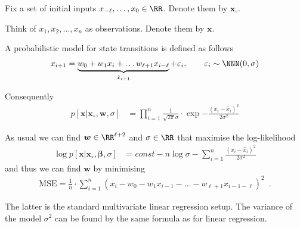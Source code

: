 \documentclass[landscape,footrule]{foils}
\renewcommand{\vec}[1]{\boldsymbol{#1}}
\begin{document}

\begin{triangles}
\item Fix a set of initial inputs $x_{-\ell}, \ldots, x_{0}\in \RR$. Denote them by $\vec{x}_\circ$. 
\item Think of $x_{1},x_{2},\ldots, x_n$ as observations. Denote them by $\vec{x}$.  
\item A probabilistic model for state transitions is defined as follows
\begin{align*}
  x_{i+1}=\underbrace{w_0 +w_1x_i+\ldots w_{\ell+1} x_{i-\ell}}_{\hat{x}_{i+1}}+\varepsilon_i,\qquad \varepsilon_i\sim\NNN(0,\sigma)
\end{align*}
\item Consequently 
\begin{align*}
 p[\vec{x}|\vec{x}_\circ,\vec{w},\sigma]&=\prod_{i=1}^n\frac{1}{\sqrt{2\pi}
    \sigma}\cdot\exp{-\frac{(x_i-\hat{x}_i)^2}{2\sigma^2}}
\end{align*}
\end{triangles}



As usual we can find  $\vec{w}\in \RR^{\ell+2}$ and $\sigma\in\RR$ that maximise the log-likelihood
\begin{align*}
\log p[\vec{x}|\vec{x}_\circ,\vec{\beta},\sigma]&= const -n\log \sigma-\sum_{i=1}^n\frac{(x_i-\hat{x}_i)^2}{2\sigma^2}
\end{align*}
and thus we can find $\vec{w}$ by minimising 
\begin{align*}
\text{MSE}=\frac{1}{n}\cdot \sum_{i=1}^n(x_i-w_0-w_1x_{i-1}-\ldots- w_{\ell+1} x_{i-1-\ell})^2\enspace.
\end{align*}

The latter is the standard multivariate linear regression setup. The variance of the model $\sigma^2$ can be found by the same formula as for linear regression.
 


\end{document}
